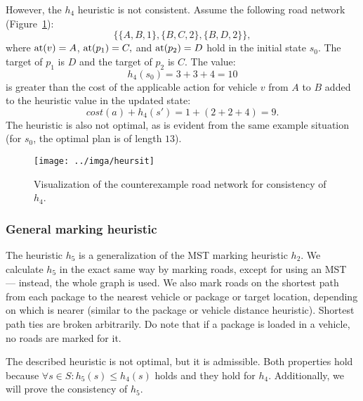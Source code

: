 However, the $h_4$ heuristic is not consistent. Assume the following road network (Figure~\ref{fig:heursit}):
$$\{\{A, B, 1\}, \{B, C, 2\}, \{B, D, 2\}\},$$
where $\textrm{at}(v) = A$, $\textrm{at}(p_1) = C,$ and $\textrm{at}(p_2) = D$
hold in the initial state $s_0$.
The target of $p_1$ is $D$ and the target of $p_2$ is $C$.
The value:
$$h_4(s_0) = 3+3+4 = 10$$ is greater than the cost
of the applicable \drive{} action for vehicle $v$ from $A$ to $B$
added to the heuristic value in the updated state:
$$cost(a) + h_4(s') = 1 + (2+2+4) = 9.$$
The heuristic is also not optimal, as is evident from the same
example situation (for $s_0$, the optimal plan is of length $13$).

\begin{figure}[tb]
\centering
\texttt{[image: ../imga/heursit]}
\caption{Visualization of the counterexample road network
for consistency of $h_4$.}
\label{fig:heursit}
\end{figure}

\subsubsection{General marking heuristic}\label{sfa5}

The heuristic $h_5$ is a generalization of the MST marking heuristic $h_2$. We calculate $h_5$ in the exact same way by marking roads,
except for
using an MST --- instead, the whole graph is used.
We also mark roads on the shortest path from each package to the nearest
vehicle or package or target location, depending on which is nearer (similar
to the package or vehicle distance heuristic).
Shortest path ties are broken arbitrarily.
Do note that if a package is loaded in a vehicle, no roads are marked for it.

The described heuristic is not optimal, but it is admissible.
Both properties hold because $\forall s \in S : h_5(s) \leq h_4(s)$ holds
and they hold for $h_4$.
Additionally, we will prove the consistency of $h_5$.

